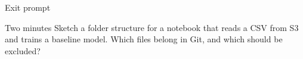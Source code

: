 \documentclass[../m00-session-01.tex]{subfiles}
\begin{document}

\begin{frame}{Exit prompt}
  \begin{ExerciseBox}{Two minutes}
    Sketch a folder structure for a notebook that reads a CSV from S3 and trains a baseline model. Which files belong in Git, and which should be excluded?
  \end{ExerciseBox}
\end{frame}
\end{document}
